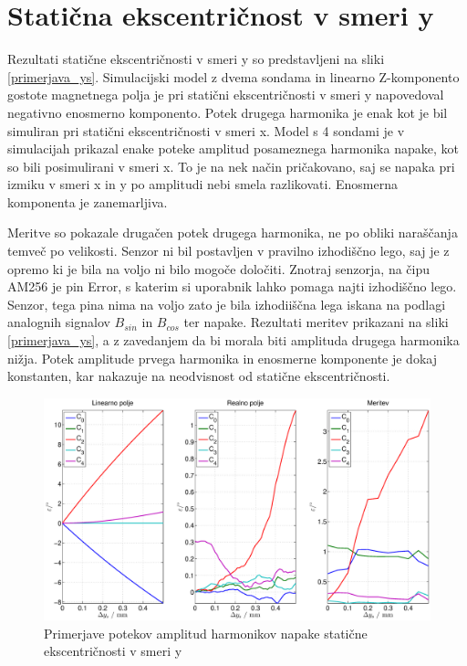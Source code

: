 \section{Statična ekscentričnost v smeri y}
Rezultati statične ekscentričnosti v smeri y so predstavljeni na sliki \ref{primerjava_ys}. Simulacijski model z dvema sondama in linearno Z-komponento gostote magnetnega polja je pri statični ekscentričnosti v smeri y napovedoval negativno enosmerno komponento. Potek drugega harmonika je enak kot je bil simuliran pri statični ekscentričnosti v smeri x. Model s 4 sondami je v simulacijah prikazal  enake poteke amplitud posameznega harmonika napake, kot so bili posimulirani v smeri x. To je na nek način pričakovano, saj se napaka pri izmiku v smeri x in y po amplitudi nebi smela razlikovati. Enosmerna komponenta je zanemarljiva.

Meritve so pokazale drugačen potek drugega harmonika, ne po obliki naraščanja temveč po velikosti. Senzor ni bil postavljen v pravilno izhodiščno lego, saj je z opremo ki je bila na voljo ni bilo mogoče določiti. Znotraj senzorja, na čipu AM256 je pin Error, s katerim si uporabnik lahko pomaga najti izhodiščno lego. Senzor, tega pina nima na voljo zato je bila izhodiiščna lega iskana na podlagi analognih signalov $B_{sin}$ in $B_{cos}$ ter napake. Rezultati meritev prikazani na sliki \ref{primerjava_ys}, a z zavedanjem da bi morala biti amplituda drugega harmonika nižja. Potek amplitude prvega harmonika in enosmerne komponente je dokaj konstanten, kar nakazuje na neodvisnost od statične ekscentričnosti. 
\begin{figure}[ht]

	\centering
	\includegraphics[width=\columnwidth]{./Slike/primerjava_ys.eps}
	\caption{Primerjave potekov amplitud harmonikov napake  statične ekscentričnosti v smeri y}
	\label{primerjava_xs}
\end{figure}

